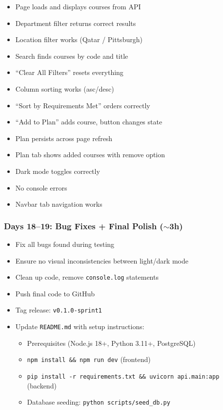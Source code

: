 \documentclass[11pt]{article}
\begin{document}
\begin{itemize}[leftmargin=2em]
    \item[$\square$] Page loads and displays courses from API
    \item[$\square$] Department filter returns correct results
    \item[$\square$] Location filter works (Qatar / Pittsburgh)
    \item[$\square$] Search finds courses by code and title
    \item[$\square$] ``Clear All Filters'' resets everything
    \item[$\square$] Column sorting works (asc/desc)
    \item[$\square$] ``Sort by Requirements Met'' orders correctly
    \item[$\square$] ``Add to Plan'' adds course, button changes state
    \item[$\square$] Plan persists across page refresh
    \item[$\square$] Plan tab shows added courses with remove option
    \item[$\square$] Dark mode toggles correctly
    \item[$\square$] No console errors
    \item[$\square$] Navbar tab navigation works
\end{itemize}

\subsubsection{Days 18--19: Bug Fixes + Final Polish ($\sim$3h)}

\begin{itemize}[leftmargin=2em]
    \item Fix all bugs found during testing
    \item Ensure no visual inconsistencies between light/dark mode
    \item Clean up code, remove \texttt{console.log} statements
    \item Push final code to GitHub
    \item Tag release: \texttt{v0.1.0-sprint1}
    \item Update \texttt{README.md} with setup instructions:
    \begin{itemize}
        \item Prerequisites (Node.js 18+, Python 3.11+, PostgreSQL)
        \item \texttt{npm install \&\& npm run dev} (frontend)
        \item \texttt{pip install -r requirements.txt \&\& uvicorn api.main:app} (backend)
        \item Database seeding: \texttt{python scripts/seed\_db.py}
    \end{itemize}
\end{itemize}
\end{document}
